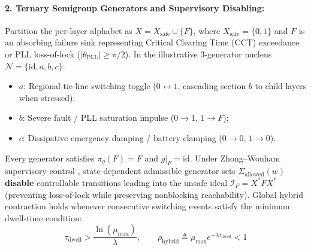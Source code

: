 \documentclass[11pt]{article}
\begin{document}
\paragraph{2. Ternary Semigroup Generators and Supervisory Disabling:}
Partition the per-layer alphabet as $X = X_{\mathrm{safe}} \cup \{F\}$, where $X_{\mathrm{safe}} = \{0, 1\}$ and $F$ is an absorbing failure sink representing Critical Clearing Time (CCT) exceedance or PLL loss-of-lock ($|\theta_{\mathrm{PLL}}| \ge \pi/2$). In the illustrative 3-generator nucleus $\mathcal{N} = \{\mathrm{id}, a, b, c\}$:
\begin{itemize}
    \item $a$: Regional tie-line switching toggle ($0 \leftrightarrow 1$, cascading section $b$ to child layers when stressed);
    \item $b$: Severe fault / PLL saturation impulse ($0 \to 1$, $1 \to F$);
    \item $c$: Dissipative emergency damping / battery clamping ($0 \to 0$, $1 \to 0$).
\end{itemize}
Every generator satisfies $\pi_g(F) = F$ and $g|_F = \mathrm{id}$. Under Zhong--Wonham supervisory control \cite{ZhongWonham1990}, state-dependent admissible generator sets $\Sigma_{\mathrm{allowed}}(w)$ \textbf{disable} controllable transitions leading into the unsafe ideal $\mathcal{I}_F = X^* F X^*$ (preventing loss-of-lock while preserving nonblocking reachability). Global hybrid contraction holds whenever consecutive switching events satisfy the minimum dwell-time condition:
\begin{equation}
\tau_{\mathrm{dwell}} > \frac{\ln(\mu_{\max})}{\lambda}, \qquad \rho_{\mathrm{hybrid}} \triangleq \mu_{\max} e^{-\lambda \tau_{\mathrm{dwell}}} < 1
\end{equation}
\end{document}
